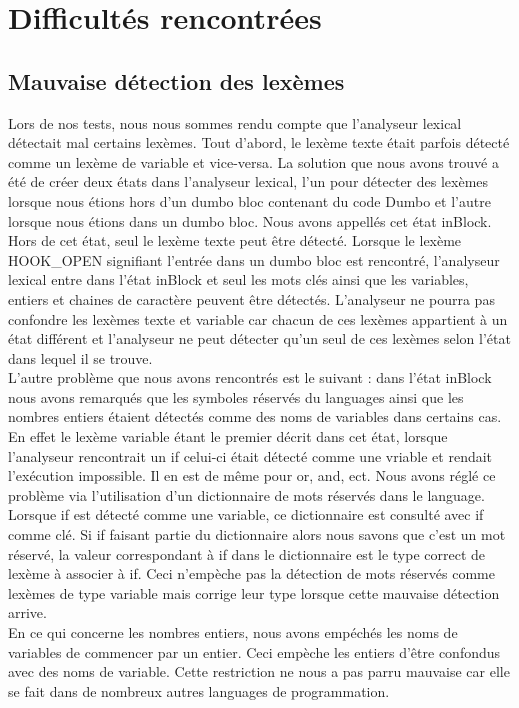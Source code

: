 \documentclass[a4paper,10pt]{article}
\begin{document}
\section{Difficultés rencontrées}

\subsection{Mauvaise détection des lexèmes}
Lors de nos tests, nous nous sommes rendu compte que l'analyseur lexical détectait mal certains lexèmes. Tout d'abord, le lexème texte était parfois détecté comme un lexème de variable
et vice-versa. La solution que nous avons trouvé a été de créer deux états dans l'analyseur lexical, l'un pour détecter des lexèmes lorsque nous étions hors d'un dumbo bloc 
contenant du code Dumbo et l'autre lorsque nous étions dans un dumbo bloc. Nous avons appellés cet état inBlock. Hors de cet état, seul le lexème texte peut être détecté. 
Lorsque le lexème HOOK\_OPEN signifiant l'entrée dans un dumbo bloc est rencontré, l'analyseur lexical entre dans l'état inBlock et seul les mots clés ainsi que les variables, entiers et 
chaines de caractère peuvent être détectés. L'analyseur ne pourra pas confondre les lexèmes texte et variable car chacun de ces lexèmes appartient à un état différent et l'analyseur 
ne peut détecter qu'un seul de ces lexèmes selon l'état dans lequel il se trouve. \\
L'autre problème que nous avons rencontrés est le suivant : dans l'état inBlock nous avons remarqués que les symboles réservés du languages ainsi que les nombres entiers 
étaient détectés comme des noms de variables dans certains cas. En effet le lexème variable étant le premier décrit dans cet état, lorsque l'analyseur rencontrait un \textrm{if} celui-ci 
était détecté comme une vriable et rendait l'exécution impossible. Il en est de même pour \textrm{or}, \textrm{and}, ect. Nous avons réglé ce problème via l'utilisation d'un dictionnaire
de mots réservés dans le language. Lorsque \textrm{if} est détecté comme une variable, ce dictionnaire est consulté avec \textrm{if} comme clé. Si if faisant partie du dictionnaire 
alors nous savons que c'est un mot réservé, la valeur correspondant à \textrm{if} dans le dictionnaire est le type correct de lexème à associer à \textrm{if}. Ceci n'empèche pas la détection
de mots réservés comme lexèmes de type variable mais corrige leur type lorsque cette mauvaise détection arrive.\\
En ce qui concerne les nombres entiers, nous avons empéchés les noms de variables de commencer par un entier. Ceci empèche les entiers d'être confondus avec des noms de variable. 
Cette restriction ne nous a pas parru mauvaise car elle se fait dans de nombreux autres languages de programmation.
\end{document}
